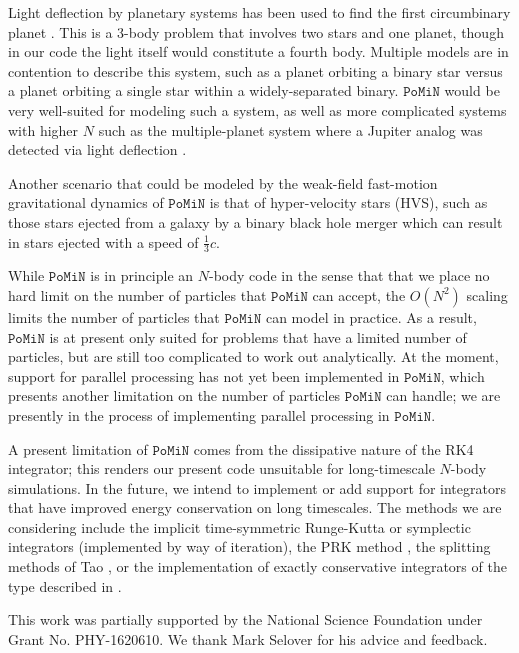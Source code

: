 \documentclass[aps,onecolumn,notitlepage,eqsecnum,nofootinbib,floatfix,superscriptaddress]{revtex4-1}
\newcommand{\codename}{\mathtt{PoMiN}}
\begin{document}
Light deflection by planetary systems has been used to find the first circumbinary planet \cite{circumbinary_planet}.  This is a 3-body problem that involves two stars and one planet, though in our code the light itself would constitute a fourth body.  Multiple models are in contention to describe this system, such as a planet orbiting a binary star versus a planet orbiting a single star within a widely-separated binary.  $\codename$ would be very well-suited for modeling such a system, as well as more complicated systems with higher $N$ such as the multiple-planet system where a Jupiter analog was detected via light deflection \cite{Jupiter_microlensing}.

Another scenario that could be modeled by the weak-field fast-motion gravitational dynamics of $\codename$ is that of hyper-velocity stars (HVS), such as those stars ejected from a galaxy by a binary black hole merger which can result in stars ejected with a speed of $\frac{1}{3} c$.  \cite{Loeb1} \cite{Loeb2} 

While $\codename$ is in principle an $N$-body code in the sense that that we place no hard limit on the number of particles that $\codename$ can accept, the $O(N^2)$ scaling limits the number of particles that $\codename$ can model in practice. As a result, $\codename$ is at present only suited for problems that have a limited number of particles, but are still too complicated to work out analytically. At the moment, support for parallel processing has not yet been implemented in $\codename$, which presents another limitation on the number of particles $\codename$ can handle; we are presently in the process of implementing parallel processing in $\codename$. 

A present limitation of $\codename$ comes from the dissipative nature of the RK4 integrator; this renders our present code unsuitable for long-timescale $N$-body simulations. In the future, we intend to implement or add support for integrators that have improved energy conservation on long timescales. The methods we are considering include the implicit time-symmetric Runge-Kutta or symplectic integrators \cite{Hutetal1997,Hutetal1995} (implemented by way of iteration), the PRK method \cite{SanzSernaCalvo1994}, the splitting methods of Tao \cite{Tao2016}, or the implementation of exactly conservative integrators of the type described in \cite{Shadwicketal1995}. 

\begin{acknowledgments}
This work was partially supported by the National Science Foundation under Grant No. PHY-1620610. We thank Mark Selover for his advice and feedback.
\end{acknowledgments}


\end{document}

